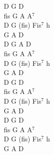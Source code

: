 \documentclass[a5paper, 10pt]{book}
\begin{document}
\begin{minipage}[t]{0.3\textwidth}
D G D\\
fis G A A$^7$\\
D G (fis) Fis$^7$ h\\
G A D\\

D G A D\\
fis G A A$^7$\\
D G (fis) Fis$^7$ h\\
G A D\\

D G D\\
fis G A A$^7$\\
D G (fis) Fis$^7$ h\\
G A D\\

D G D\\
fis G A A$^7$\\
D G (fis) Fis$^7$ h\\
G A D\\
\end{minipage}

\newpage
\end{document}
